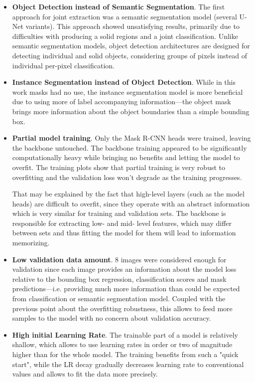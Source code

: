 \documentclass[thesis=B,english]{FITthesis}[2019/12/23]
\begin{document}
\begin{itemize}
	
	\item \textbf{Object Detection instead of Semantic Segmentation}. The first approach for joint extraction was a semantic segmentation model (several U-Net variants). This approach showed unsatisfying results, primarily due to difficulties with producing a solid regions and a joint classification. Unlike semantic segmentation models, object detection architectures are designed for detecting individual and solid objects, considering groups of pixels instead of individual per-pixel classification.
	
	\item \textbf{Instance Segmentation instead of Object Detection}. While in this work masks had no use, the instance segmentation model is more beneficial due to using more of label accompanying information---the object mask brings more information about the object boundaries than a simple bounding box.
	
	\item \textbf{Partial model training}. Only the Mask R-CNN heads were trained, leaving the backbone untouched. The backbone training appeared to be significantly computationally heavy while bringing no benefits and letting the model to overfit. The training plots show that partial training is very robust to overfitting and the validation loss won't degrade as the training progresses.
	
	That may be explained by the fact that high-level layers (such as the model heads) are difficult to overfit, since they operate with an abstract information which is very similar for training and validation sets. The backbone is responsible for extracting low- and mid- level features, which may differ between sets and thus fitting the model for them will lead to information memorizing.
	
	\item \textbf{Low validation data amount}. 8 images were considered enough for validation since each image provides an information about the model loss relative to the bounding box regression, classification scores and mask predictions---i.e. providing much more information than could be expected from classification or semantic segmentation model. Coupled with the previous point about the overfitting robustness, this allows to feed more samples to the model with no concern about validation accuracy.
	
	\item \textbf{High initial Learning Rate}. The trainable part of a model is relatively shallow, which allows to use learning rates in order or two of magnitude higher than for the whole model. The training benefits from such a "quick start", while the LR decay gradually decreases learning rate to conventional values and allows to fit the data more precisely.
	
\end{itemize}
\end{document}
